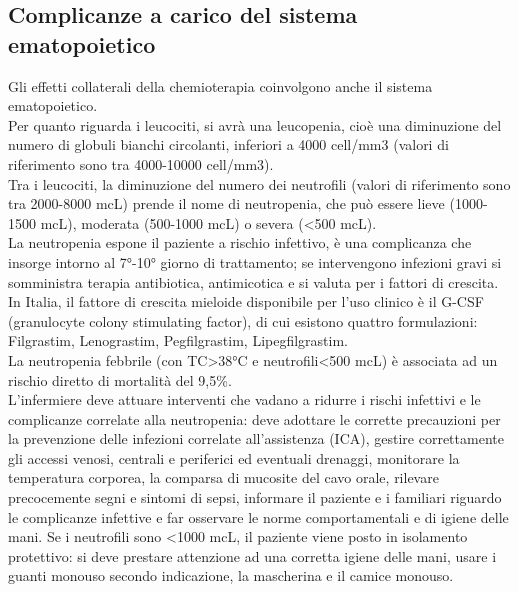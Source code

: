 \subsection{Complicanze a carico del sistema ematopoietico}

Gli effetti collaterali della chemioterapia coinvolgono anche il sistema ematopoietico.\\
Per quanto riguarda i leucociti, si avrà una leucopenia, cioè una diminuzione del numero di globuli bianchi 
circolanti, inferiori a 4000 cell/mm3 (valori di riferimento sono tra 4000-10000 cell/mm3).\\ 
Tra i leucociti, la diminuzione del numero dei neutrofili (valori di riferimento sono tra 2000-8000 mcL) 
prende il nome di neutropenia, che può essere lieve (1000-1500 mcL), moderata (500-1000 mcL) o severa (<500 mcL).\\ 
La neutropenia espone il paziente a rischio infettivo, è una complicanza che insorge intorno al 7°-10° giorno di 
trattamento; se intervengono infezioni gravi si somministra terapia antibiotica, antimicotica e si valuta per i 
fattori di crescita\cite{AIOMTOSS}. In Italia, il fattore di crescita mieloide disponibile per l’uso clinico 
è il G-CSF (granulocyte colony stimulating factor), di cui esistono quattro formulazioni: 
Filgrastim, Lenograstim, Pegfilgrastim, Lipegfilgrastim\cite{AIOMTOSS}.\\
La neutropenia febbrile (con TC>38°C e neutrofili<500 mcL) è associata ad un rischio diretto di mortalità del 9,5\%.\\ 
L’infermiere deve attuare interventi che vadano a ridurre i rischi infettivi e le complicanze correlate alla 
neutropenia: deve adottare le corrette precauzioni per la prevenzione delle infezioni correlate all’assistenza (ICA), 
gestire correttamente gli accessi venosi, centrali e periferici ed eventuali drenaggi, monitorare la temperatura 
corporea, la comparsa di mucosite del cavo orale, rilevare precocemente segni e sintomi di sepsi, informare il 
paziente e i familiari riguardo le complicanze infettive e far osservare le norme comportamentali e di igiene delle mani. 
Se i neutrofili sono <1000 mcL, il paziente viene posto in isolamento protettivo: si deve prestare attenzione 
ad una corretta igiene delle mani, usare i guanti monouso secondo indicazione, la mascherina e il camice monouso\cite{ISOLAMENTO}.

